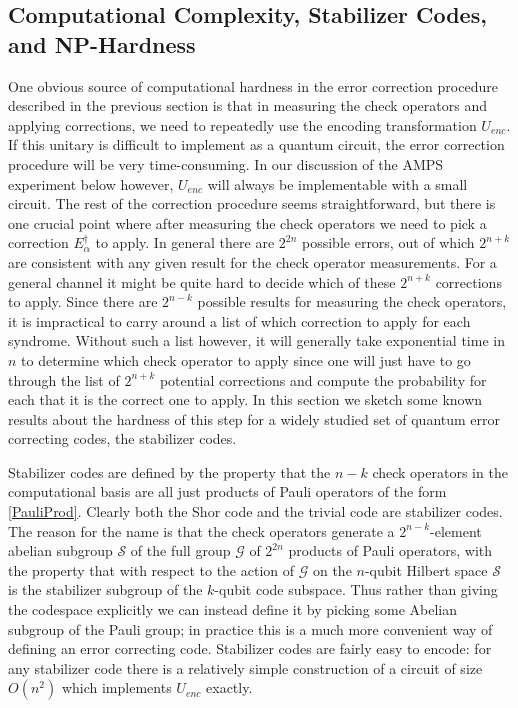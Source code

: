 \documentclass[12pt]{article}
\newcommand{\textcs}[1]{\textsf{#1}}
\newcommand{\NP}{\textcs{NP}}
\begin{document}
\subsection{Computational Complexity, Stabilizer Codes, and \NP-Hardness}\label{corrcomp}
One obvious source of computational hardness in the error correction procedure described in the previous section is that in measuring the check operators and applying corrections, we need to repeatedly use the encoding transformation $U_{enc}$.  If this unitary is difficult to implement as a quantum circuit, the error correction procedure will be very time-consuming.  In our discussion of the AMPS experiment below however, $U_{enc}$ will always be implementable with a small circuit.  The rest of the correction procedure seems straightforward, but there is one crucial point where after measuring the check operators we need to pick a correction $E_\alpha^\dagger$ to apply.  In general there are $2^{2n}$ possible errors, out of which $2^{n+k}$ are consistent with any given result for the check operator measurements.  For a general channel it might be quite hard to decide which of these $2^{n+k}$ corrections to apply.  Since there are $2^{n-k}$ possible results for measuring the check operators, it is impractical to carry around a list of which correction to apply for each syndrome.  Without such a list however, it will generally take exponential time in $n$ to determine which check operator to apply since one will just have to go through the list of $2^{n+k}$ potential corrections and compute the probability for each that it is the correct one to apply.  In this section we sketch some known results about the hardness of this step for a widely studied set of quantum error correcting codes, the stabilizer codes.

Stabilizer codes \cite{gottesman1997stabilizer} are defined by the property that the $n-k$ check operators in the computational basis are all just products of Pauli operators of the form \eqref{PauliProd}.  Clearly both the Shor code and the trivial code are stabilizer codes.  The reason for the name is that the check operators generate a $2^{n-k}$-element abelian subgroup $\mathcal{S}$ of the full group $\mathcal{G}$ of $2^{2n}$ products of Pauli operators, with the property that with respect to the action of $\mathcal{G}$ on the $n$-qubit Hilbert space $\mathcal{S}$ is the stabilizer subgroup of the $k$-qubit code subspace.  Thus rather than giving the codespace explicitly we can instead define it by picking some Abelian subgroup of the Pauli group; in practice this is a much more convenient way of defining an error correcting code.  Stabilizer codes are fairly easy to encode: for any stabilizer code there is a relatively simple construction \cite{gottesman1997stabilizer} of a circuit of size $O(n^2)$ which implements $U_{enc}$ exactly.  
\end{document}
